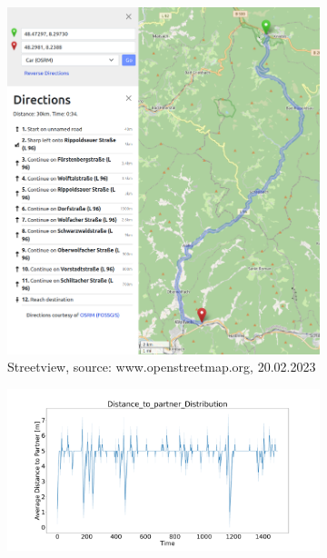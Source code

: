 \begin{figure}[H]
    \centering
    \begin{subfigure}[b]{0.45\textwidth}
        \centering
        \includegraphics[width=1.0\linewidth]{images/Rippoldsauer/Rippoldsauer.png}
        \caption{Streetview, source: www.openstreetmap.org, 20.02.2023}
    \end{subfigure}
    \hfill
    \begin{subfigure}[b]{0.45\textwidth}
        \centering
        \includegraphics[width=1.0\textwidth]{images/Rippoldsauer/Rippoldsauer_AVG_Distance_to_partner_distribution_free.png}

\end{subfigure}
\end{figure}
